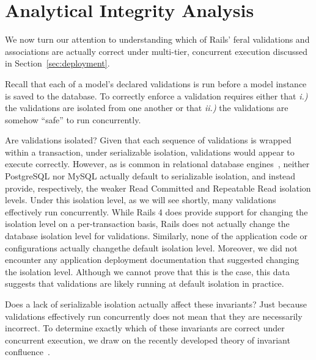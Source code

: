 
\section{Analytical Integrity Analysis}
\label{sec:apps}

We now turn our attention to understanding which of Rails' feral
validations and associations are actually correct under multi-tier,
concurrent execution discussed in Section~\ref{sec:deployment}.

Recall that each of a model's declared validations is run before a model instance is saved to
the database. To correctly enforce a validation requires either that
\textit{i.)} the validations are isolated from one another or
that \textit{ii.)} the validations are somehow ``safe'' to run
concurrently.

Are validations isolated? Given that each sequence of validations is
wrapped within a transaction, under serializable isolation,
validations would appear to execute correctly. However, as is common
in relational database engines~\cite{hat-vldb}, neither PostgreSQL nor
MySQL actually default to serializable isolation, and instead provide,
respectively, the weaker Read Committed and Repeatable Read isolation
levels. Under this isolation level, as we will see shortly, many
validations effectively run concurrently. While Rails 4 does provide
support for changing the isolation level on a per-transaction basis,
Rails does not actually change the database isolation level for
validations. Similarly, none of the application code or configurations
actually changethe default isolation level. Moreover, we did not
encounter any application deployment documentation that suggested
changing the isolation level. Although we cannot prove that this is
the case, this data suggests that validations are likely running at
default isolation in practice.

Does a lack of serializable isolation actually affect these
invariants? Just because validations effectively run concurrently does
not mean that they are necessarily incorrect. To determine exactly
which of these invariants are correct under concurrent execution, we
draw on the recently developed theory of invariant
confluence~\cite{coord-avoid}.

